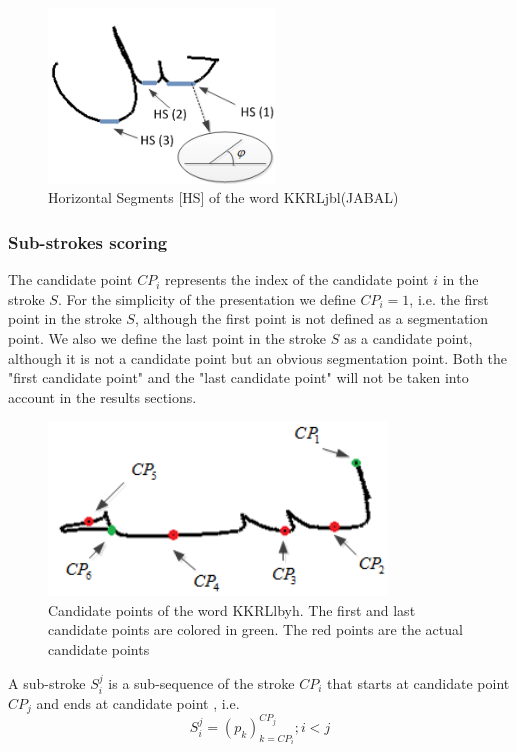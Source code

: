 \documentclass[12pt,journal,compsoc]{IEEEtran}
\begin{document}
\begin{figure}[h]
\centering
\includegraphics[width=6cm]{./figures/horizontal_segments}
\caption{Horizontal Segments [HS] of the word KKRL{jbl}(JABAL)}
\label{fig:horizontal_segments}
\end{figure}

\subsubsection{Sub-strokes scoring}
The candidate point $CP_{i}$ represents the index of the candidate point $i$ in the stroke $S$. For the simplicity of the presentation we define $CP_{i}=1$, i.e. the first point in the stroke $S$, although the first point is not defined as a segmentation point. We also we define the last point in the stroke $S$ as a candidate point, although it is not a candidate point but an obvious segmentation point. Both the "first candidate point" and the "last candidate point" will not be taken into account in the results sections.   

\begin{figure}[h]
\centering
\includegraphics[width=9cm]{./figures/candidate_points}
\caption{Candidate points of the word  KKRL{lbyh}. The first and last candidate points are colored in green. The red points are the actual candidate points}
\label{fig:candidate_points}
\end{figure}

A sub-stroke $S_{i}^{j}$ is a sub-sequence of the stroke $CP_{i}$ that starts at candidate point $CP_{j}$ and ends at candidate point , i.e.
\begin{equation}
S_{i}^{j}=(p_{k})_{k=CP_{i}}^{CP_{j}}; i<j
\end{equation}
\end{document}

